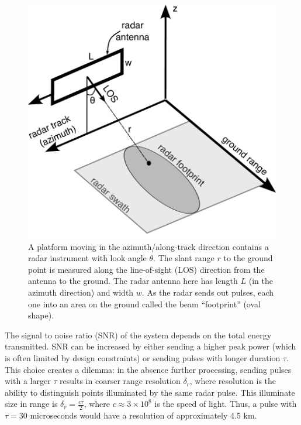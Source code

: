 \begin{figure}
	\centering
		\includegraphics[width=0.99\linewidth]{figures/chapter3-sar/ch3-sar-geometry.pdf}
	\caption[Acquisition geometry of a SAR platform]{
	A platform moving in the azimuth/along-track direction contains a radar instrument with look angle $\theta$.
    The slant range $r$ to the ground point is measured along the line-of-sight (LOS) direction from the antenna to the ground.
   	The radar antenna here has length $L$ (in the azimuth direction) and width $w$.
   	As the radar sends out pulses, each one into an area on the ground called the beam ``footprint'' (oval shape). 
	}
	\label{fig:ch3-sar-geometry}
\end{figure}

%

The signal to noise ratio (SNR) of the system depends on the total energy transmitted.  SNR can be increased by either sending a higher peak power (which is often limited by design constraints) or sending pulses with longer duration $\tau$. This choice creates a dilemma: in the absence further processing, sending pulses with a larger $\tau$ results in coarser range resolution $\delta_r$, where resolution is the ability to distinguish points illuminated by the same radar pulse. This illuminate size in range is $\delta_r = \frac{c \tau}{2}$, where $c \approx 3 \times 10^8$ is the speed of light. Thus, a pulse with $\tau = 30 $ microseconds would have a resolution of approximately 4.5 km.

